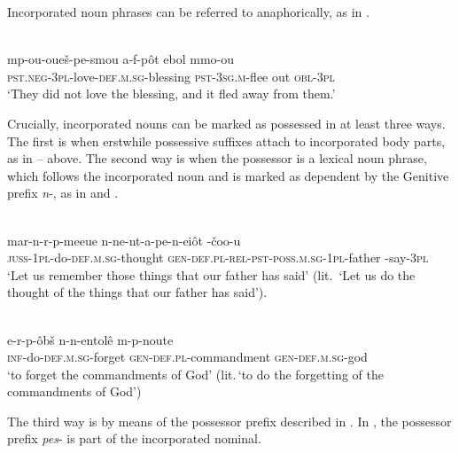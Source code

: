 \documentclass[output=paper]{LSP/langsci}
\begin{document}
Incorporated noun phrases can be referred to anaphorically, as in .

\begin{exe}
\ex%
\label{05-gr-ex:38}
\\
\gll mp-ou-oueš-pe-smou a-f-pôt ebol mmo-ou\\
\textsc{pst.neg-3pl}-love-\textsc{def.m.sg}-blessing \textsc{pst-3sg.m}-flee out \textsc{obl}-\textsc{3pl}\\
\glt ‘They did not love the blessing, and it fled away from them.’
\end{exe}

Crucially, incorporated nouns can be marked as possessed in at least three ways. The first is when erstwhile possessive suffixes attach to incorporated body parts, as in --  above. The second way is when the possessor is a lexical noun phrase, which follows the incorporated noun and is marked as dependent by the Genitive prefix \textit{n}-, as in  and . 

\begin{exe}
\ex%
\label{05-gr-ex:39}
\\
\gll mar-n-r-p-meeue n-ne-nt-a-pe-n-eiôt -čoo-u\\
\textsc{juss-1pl}-do-\textsc{def.m.sg}-thought{\rmfnm} \textsc{gen}-\textsc{def.pl-rel-pst-poss.m.sg-1pl}-father -say-\textsc{3pl}\\
\glt ‘Let us remember those things that our father has said’ (lit.\, ‘Let us do the thought of the things that our father has said’).
\end{exe}


\begin{exe}
\ex%
\label{05-gr-ex:40}
\\
\gll e-r-p-ôbš n-n-entolê m-p-noute\\
\textsc{inf}-do-\textsc{def.m.sg}-forget \textsc{gen}-\textsc{def.pl}-commandment \textsc{gen-def.m.sg}-god\\
\glt ‘to forget the commandments of God’ (lit.\,`to do the forgetting of the commandments of God') 
\end{exe}

The third way is by means of the possessor prefix described in . In , the possessor prefix \textit{pes}- is part of the incorporated nominal.
\end{document}

